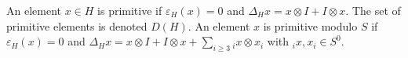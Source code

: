 An element $x \in H$ is primitive if $\varepsilon_H(x) = 0$ and $\Delta_H x = x \otimes I + I \otimes x$. The set of primitive elements is denoted $D(H)$. An element $x$ is primitive modulo $S$ if $\varepsilon_H(x) = 0$ and $\Delta_H x = x \otimes I + I \otimes x + \sum_{i \geq 3} {}_i x \otimes x_i$ with ${}_i x, x_i \in S^0$.
